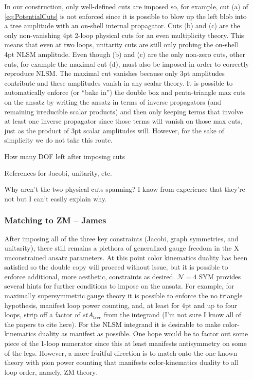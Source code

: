 \documentclass[11pt,letter]{article}
\begin{document}
In our construction, only well-defined cuts are imposed so, for example, cut (a) of \eqref{eq:PotentialCuts} is not enforced since it is possible to blow up the left blob into a tree amplitude with an on-shell internal propagator.
Cuts (b) and (c) are the only non-vanishing 4pt 2-loop physical cuts for an even multiplicity theory.
This means that even at two loops, unitarity cuts are still only probing the on-shell 4pt NLSM amplitude.
Even though (b) and (c) are the only non-zero cuts, other cuts, for example the maximal cut (d), must also be imposed in order to correctly reproduce NLSM.
The maximal cut vanishes because only 3pt amplitudes contribute and these amplitudes vanish in any scalar theory.
It is possible to automatically enforce (or ``bake in'') the double box and penta-triangle max cuts on the ansatz by writing the ansatz in terms of inverse propagators (and remaining irreducible scalar products) and then only keeping terms that involve at least one inverse propagator since those terms will vanish on those max cuts, just as the product of 3pt scalar amplitudes will.
However, for the sake of simplicity we do not take this route.

How many DOF left after imposing cuts

References for Jacobi, unitarity, etc.

Why aren't the two physical cuts spanning?  I know from experience that they're not but I can't easily explain why.

\subsubsection{Matching to ZM -- James}

After imposing all of the three key constraints (Jacobi, graph symmetries, and unitarity), there still remains a plethora of generalized gauge freedom in the X unconstrained ansatz parameters.
At this point color kinematics duality has been satisfied so the double copy will proceed without issue, but it is possible to enforce additional, more aesthetic, constraints as desired.
$\mathcal{N}=4$ SYM provides several hints for further conditions to impose on the ansatz.
For example, for maximally supersymmetric gauge theory it is possible to enforce the no triangle hypothesis, manifest loop power counting, and, at least for 4pt and up to four loops, strip off a factor of $st A_\text{tree}$ from the integrand (I'm not sure I know all of the papers to cite here).
For the NLSM integrand it is desirable to make color-kinematics duality as manifest as possible.
One hope would be to factor out some piece of the 1-loop numerator since this at least manifests antisymmetry on some of the legs.
However, a more fruitful direction is to match onto the one known theory with pion power counting that manifests color-kinematics duality to all loop order, namely, ZM theory.
\end{document}
